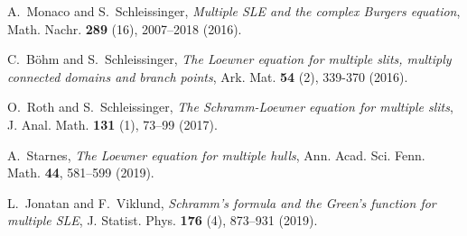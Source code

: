 \documentclass[
11pt,%
tightenlines,%
twoside,%
onecolumn,%
nofloats,%
nobibnotes,%
nofootinbib,%
superscriptaddress,%
noshowpacs,%
centertags]%
{revtex4}
\begin{document}
\begin{thebibliography}{20}
A.~Monaco and S.~Schleissinger, \textit{Multiple SLE and the complex Burgers equation}, Math. Nachr. \textbf{289} (16), 2007--2018 (2016).

C.~B\"ohm and S.~Schleissinger, \textit{The Loewner equation for multiple slits, multiply connected domains and branch points}, Ark. Mat. \textbf{54} (2), 339-370 (2016).

O.~Roth and S.~Schleissinger, \textit{The Schramm-Loewner equation for multiple slits}, J. Anal. Math. \textbf{131} (1), 73--99 (2017).

A.~Starnes, \textit{The Loewner equation for multiple hulls}, Ann. Acad. Sci. Fenn. Math. \textbf{44}, 581--599 (2019).

L.~Jonatan and F.~Viklund, \textit{Schramm's formula and the Green's function for multiple SLE}, J. Statist. Phys. \textbf{176} (4), 873--931 (2019).

\end{thebibliography}
\end{document}
